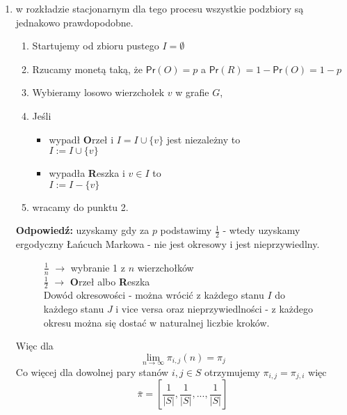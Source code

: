 \begin{enumerate}[label=\alph*)]
\item  w rozkładzie stacjonarnym dla tego procesu wszystkie podzbiory są jednakowo prawdopodobne.

\begin{enumerate}[label=\arabic*.]
\item Startujemy od zbioru pustego $I=\emptyset $
\item Rzucamy monetą taką, że $\mathsf{Pr}(O)=p$ a $\mathsf{Pr}(R)=1-\mathsf{Pr}(O)=1-p$
\item Wybieramy losowo wierzchołek $v$ w grafie $G$,
\item Jeśli 
\begin{itemize}
\item[] wypadł \textbf{O}rzeł i $I=I\cup \{v\}$ jest niezależny to\\
$I:=I\cup \{v\}$
\item[] wypadła \textbf{R}eszka i $v\in I$ to\\
$I:=I- \{v\}$
\end{itemize}
\item wracamy do punktu 2.
\end{enumerate}
\textbf{Odpowiedź: }uzyskamy gdy za $p$ podstawimy $\frac{1}{2}$ - wtedy uzyskamy ergodyczny Łańcuch Markowa - nie jest okresowy i jest nieprzywiedlny.
\begin{figure}[H]
\centering
{}
\caption*{$\frac{1}{n}$ $\rightarrow$ wybranie 1 z $n$ wierzchołków\\$\frac{1}{2}$ $\rightarrow$ \textbf{O}rzeł albo \textbf{R}eszka\\Dowód okresowości - można wrócić z każdego stanu $I$ do każdego stanu $J$ i vice versa oraz nieprzywiedlności - z każdego okresu można się dostać w naturalnej liczbie kroków.}
\end{figure}
Więc dla $$\lim _{n\to\infty}\pi _{i,j}(n)=\pi _j$$ Co więcej dla dowolnej pary stanów $i,j\in S$ otrzymujemy $\pi_{i,j}=\pi _{j,i}$ więc $$\bar{\pi}=\left[\frac{1}{|S|},\frac{1}{|S|},...,\frac{1}{|S|}\right]$$


\end{enumerate}
